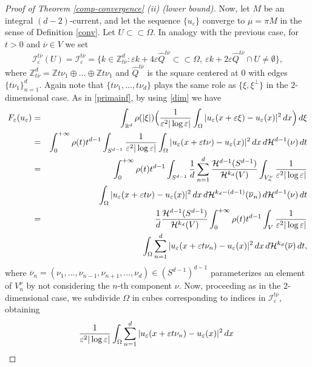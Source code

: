 \documentclass[11pt]{article}
\def\e{\varepsilon}
\def\dx{\,dx}
\begin{document}
\begin{proof}[Proof of Theorem {\rm\ref{comp-convergence}} {\rm (ii)} (lower bound)]
Now, let $M$ be an integral $(d-2)$-current, and let the sequence $\{u_\e\}$ converge to $\mu=\pi M$ in the sense of Definition \ref{conv}. 
Let $U\subset\subset\Omega$. In analogy with the previous case, for $t>0$ and $\overline \nu\in V$ we set 
$$\mathcal I_\e^{t\overline \nu}(U)=\mathcal I_\e^{t\overline \nu}=\{k\in\mathbb Z^d_{t\overline \nu}: \e k+4\e \widehat Q^{t\overline \nu}\subset\subset \Omega, \ 
\e k+2\e \widehat Q^{t\overline \nu}\cap U\neq\emptyset\},$$ 
where $\mathbb Z^d_{t\overline \nu}=
\mathbb Z t\nu_1 \oplus \dots \oplus \mathbb Z t\nu_1$ and $\widehat Q^{t\overline \nu}$ is the square centered at $0$ with edges $\{t\nu_1\}_{n=1}^{d}$. Again note that $\{t\nu_1, \dots, t\nu_d\}$ plays the same role as $\{\xi, \xi^\perp\}$ in the $2$-dimensional case. 
As in \eqref{primainf}, by using \eqref{dim} we have 
\begin{eqnarray}\label{stimainfd}
F_\e(u_\e)&=&\int_{\mathbb R^d}\rho(|\xi|) \Bigl({1\over\e^2|\log\e|}\int_{\Omega} |u_\e(x+\e\xi)-u_\e(x)|^2\dx\Bigr)\,d\xi\nonumber\\
&=&\int_0^{+\infty} \rho(t) t^{d-1}\int_{S^{d-1}} \frac{1}{\e^2|\log\e|} 
\int_{\Omega} |u_\e(x+\e t\nu)-u_\e(x)|^2\dx \, d\mathcal H^{d-1}(\nu)\, dt
\nonumber\\
&=&\int_0^{+\infty} \rho(t) t^{d-1}\int_{S^{d-1}} \frac{1}{d}\sum_{n=1}^d \frac{\mathcal H^{d-1}(S^{d-1})}{\mathcal H^{k_d}(V)}\int_{V^{\nu}_n} \frac{1}{\e^2|\log\e|}  \nonumber 
\\ 
&&{\hspace{1cm}}
\int_{\Omega} |u_\e(x+\e t\nu)-u_\e(x)|^2\dx \, d\mathcal H^{k_d-(d-1)}(\overline \nu_n)\, d\mathcal H^{d-1}(\nu)\, dt\nonumber \\
&=&\frac{1}{d}\frac{\mathcal H^{d-1}(S^{d-1})}{\mathcal H^{k_d}(V)} \int_0^{+\infty} \rho(t) t^{d-1} \int_{V} \frac{1}{\e^2|\log\e|}  
\nonumber 
\\ 
&&{\hspace{1cm}}
\int_{\Omega}\sum_{n=1}^d |u_\e(x+\e t\nu_n)-u_\e(x)|^2\dx \, d\mathcal H^{k_d}(\overline \nu)\, dt,  
\end{eqnarray}
where $\overline \nu_n=(\nu_1, \dots, \nu_{n-1},\nu_{n+1},\dots, \nu_d)\in (S^{d-1})^{d-1}$ parameterizes an element of 
$V^{\nu}_n$ by not considering the $n$-th component $\nu$. 
Now, proceeding as in the $2$-dimensional case, we subdivide $\Omega$ in cubes corresponding to indices in $\mathcal I_\e^{t\overline \nu}$, obtaining 
\begin{eqnarray*}
&&\hspace{-5mm}\frac{1}{\e^2|\log\e|}  \int_{\Omega}\sum_{n=1}^d |u_\e(x+\e t\nu_n)-u_\e(x)|^2\dx \\

\end{eqnarray*}
\end{proof}
\end{document}
